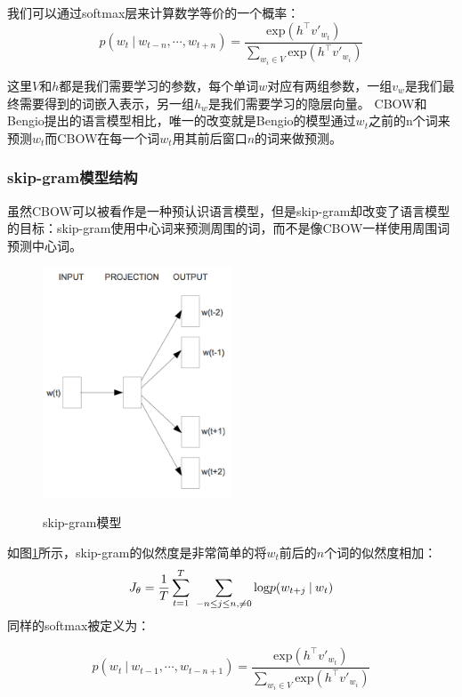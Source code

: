 我们可以通过softmax层来计算数学等价的一个概率：
\begin{equation}
p(w_t \: | \: w_{t-n} , \cdots , w_{t+n}) = \dfrac{\text{exp}({h^\top v'_{w_t}})}{\sum_{w_i \in V} \text{exp}({h^\top v'_{w_i}})}
\end{equation}

这里$V$和$h$都是我们需要学习的参数，每个单词$w$对应有两组参数，一组$v_w$是我们最终需要得到的词嵌入表示，另一组$h_w$是我们需要学习的隐层向量。
CBOW和Bengio提出的语言模型相比，唯一的改变就是Bengio的模型通过$w_t$之前的n个词来预测$w_t$而CBOW在每一个词$w_t$用其前后窗口$n$的词来做预测。
\subsubsection{skip-gram模型结构}
虽然CBOW可以被看作是一种预认识语言模型，但是skip-gram却改变了语言模型的目标：skip-gram使用中心词来预测周围的词，而不是像CBOW一样使用周围词预测中心词。
   \begin{figure}[h]
\centering
  \includegraphics[width=0.5\textwidth]{./graph/skip-gram.png}\\
  \caption{skip-gram模型\cite{word2vec}}\label{fig:skip}
\end{figure} 
如图\ref{fig:skip}所示，skip-gram的似然度是非常简单的将$w_t$前后的$n$个词的似然度相加：
\begin{equation}
J_\theta = \frac{1}{T}\sum\limits_{t=1}^T\ \sum\limits_{-n \leq j \leq n , \neq 0} \text{log} \space p(w_{t+j} \: | \: w_t)
\end{equation}
同样的softmax被定义为：

\begin{equation}
p(w_t \: | \: w_{t-1} , \cdots , w_{t-n+1}) = \dfrac{\text{exp}({h^\top v'_{w_t}})}{\sum_{w_i \in V} \text{exp}({h^\top v'_{w_i}})} 	
\end{equation}

